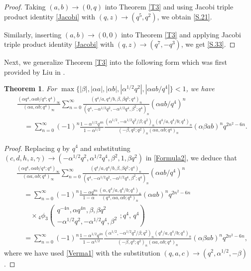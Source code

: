 \documentclass[reqno,12pt]{amsart}
\newtheorem{theorem}{Theorem}[section]%
\theoremstyle{remark}
\numberwithin{equation}{section}
\begin{document}
\begin{proof}
Taking $\left(a,b\right)\to\left(0,q\right)$ into Theorem \ref{T3} and using Jacobi triple product identity \eqref{Jacobi} with $\left(q,z\right)\to\left(q^5,q^2\right)$, we  obtain \eqref{S.21}.

Similarly, inserting $\left(a,b\right)\to\left(0,0\right)$ into Theorem \ref{T3} and applying Jacobi triple product identity \eqref{Jacobi} with $\left(q,z\right)\to\left(q^7,-q^3\right)$, we get \eqref{S.33}.
\end{proof}
Next, we generalize  Theorem \ref{T3} into the following form  which was first provided by  Liu in \cite[Proposition 11.4]{Liu_4}.
\begin{theorem}\label{T6}
For $\max\{|\beta|,|\alpha a|, |\alpha b|,  |\alpha^{1/2}q^2|, |\alpha ab/q^4|\}<1$, we have
\begin{align*}
&\frac{\left(\alpha q^4,\alpha ab/q^4;q^4\right)_{\infty}}{\left(\alpha a,\alpha b;q^4\right)_{\infty}}
\sum_{n=0}^{\infty}
\frac{\left(q^4/a,q^4/b,\beta,\beta q^2;q^4\right)_n}
{\left(q^4,-\alpha^{1/2}q^2,-\alpha^{1/2}q^4,\beta^2;q^4\right)_n}\left(\alpha ab/q^4\right)^n\\
&\quad=
\sum_{n=0}^{\infty}
\left(-1\right)^n
\frac{1-\alpha^{1/2}q^{4n}}{1-\alpha^{1/2}}
\frac{\left(\alpha^{1/2},-\alpha^{1/2}q^2/\beta;q^2\right)_n
\left(q^4/a,q^4/b;q^4\right)_n}
{\left(-\beta,q^2;q^2\right)_n\left(\alpha a,\alpha b;q^4\right)_n}\left(\alpha\beta ab\right)^nq^{2n^2-6n}.
\end{align*}
\end{theorem}
\begin{proof}
Replacing $q$ by $q^4$ and substituting $\left(c,d,h,z,\gamma\right)\to
\left(-\alpha^{1/2}q^2,\alpha^{1/2}q^4,\beta^2,1,\beta q^2\right)$ in \eqref{Formula2}, we deduce that
\begin{align*}
&\frac{\left(\alpha q^4,\alpha ab/q^4;q^4\right)_{\infty}}{\left(\alpha a,\alpha b;q^4\right)_{\infty}}
\sum_{n=0}^{\infty}
\frac{\left(q^4/a,q^4/b,\beta,\beta q^2;q^4\right)_n}
{\left(q^4,-\alpha^{1/2}q^2,-\alpha^{1/2}q^4,\beta^2;q^4\right)_n}\left(\alpha ab/q^4\right)^n\\
&\quad=
\sum_{n=0}^{\infty}\left(-1\right)^n\frac{1-\alpha q^{8n}}{1-\alpha}
\frac{\left(\alpha,q^4/a,q^4/b;q^4\right)_n}
{\left(q^4,\alpha a,\alpha b;q^4\right)_n}\left(\alpha ab\right)^nq^{2n^2-6n}\\
&\qquad \times
{_4\phi_3}\left(\begin{array}{cccc}
q^{-4n},\alpha q^{4n},\beta,\beta q^2\\
-\alpha^{1/2}q^2,-\alpha^{1/2}q^4,\beta^2
\end{array};q^4,\,q^4\right)\\
&\quad=\sum_{n=0}^{\infty}
\left(-1\right)^n
\frac{1-\alpha^{1/2}q^{4n}}{1-\alpha^{1/2}}
\frac{\left(\alpha^{1/2},-\alpha^{1/2}q^2/\beta;q^2\right)_n
\left(q^4/a,q^4/b;q^4\right)_n}
{\left(-\beta,q^2;q^2\right)_n\left(\alpha a,\alpha b;q^4\right)_n}\left(\alpha\beta ab\right)^nq^{2n^2-6n},
\end{align*}
where we have used \eqref{Verma1} with the substitution $\left(q,a,c\right)\to\left(q^2,\alpha^{1/2},-\beta\right)$.
\end{proof}
\end{document}
